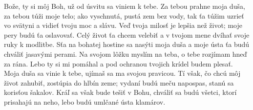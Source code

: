 Bože, ty si môj Boh, už od úsvitu sa viniem k tebe.
\versseparator
Za tebou prahne moja duša,
za tebou túži moje telo;
\versseparator
ako vyschnutá, pustá zem bez vody,
tak ťa túžim uzrieť vo svätyni
a vidieť tvoju moc a slávu.
\versseparator
Veď tvoja milosť je lepšia než život;
moje pery budú ťa oslavovať.
\versseparator
Celý život ťa chcem velebiť
a v tvojom mene dvíhať svoje ruky k modlitbe.
\versseparator
Sťa na bohatej hostine sa nasýti moja duša
a moje ústa ťa budú chváliť jasavými perami.
\versseparator
Na svojom lôžku myslím na teba,
o tebe rozjímam hneď za rána.
Lebo ty si mi pomáhal
\versseparator
a pod ochranou tvojich krídel budem plesať.
Moja duša sa vinie k tebe,
ujímaš sa ma svojou pravicou.
\versseparator
Tí však, čo chcú môj život zahubiť,
zostúpia do hlbín zeme;
vydaní budú meču napospas,
stanú sa korisťou šakalov.
\versseparator
Kráľ sa však bude tešiť v Bohu,
chváliť sa budú všetci, ktorí prisahajú na neho,
lebo budú umlčané ústa klamárov. 